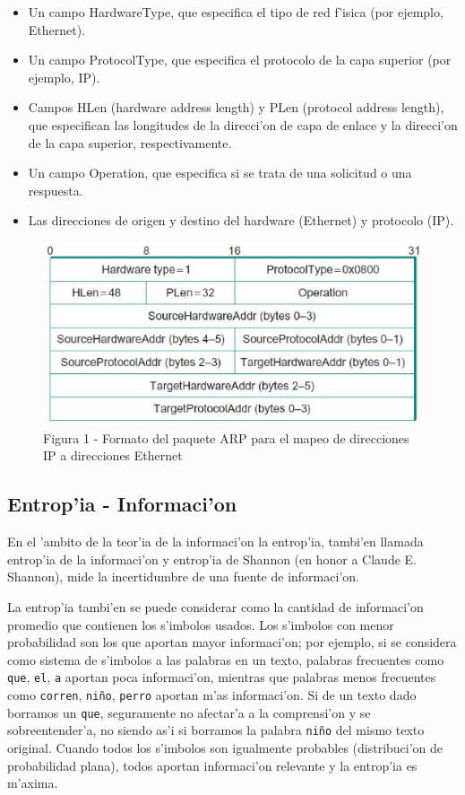 \documentclass[a4paper,10pt]{article}
\begin{document}
\begin{itemize}
	\item Un campo HardwareType, que especifica el tipo de red f'isica (por ejemplo, Ethernet).
	\item Un campo ProtocolType, que especifica el protocolo de la capa superior (por ejemplo, IP).
	\item Campos HLen (hardware address length) y PLen (protocol address length), que especifican las longitudes de la direcci'on de capa de enlace y la direcci'on de la capa superior, respectivamente.
	\item Un campo Operation, que especifica si se trata de una solicitud o una respuesta.
	\item Las direcciones de origen y destino del hardware (Ethernet) y protocolo (IP).
\end{itemize}

\begin{figure}[!hbp]
\begin{center}
\includegraphics[width=12cm]{figura1.eps}
\end{center}
\caption{Figura 1 - Formato del paquete ARP para el mapeo de direcciones IP a direcciones Ethernet} \label{figura1}
\end{figure}

\subsection{Entrop'ia - Informaci'on}

En el 'ambito de la teor'ia de la informaci'on la entrop'ia, tambi'en llamada entrop'ia de la informaci'on y entrop'ia de Shannon (en honor a Claude E. Shannon), mide la incertidumbre de una fuente de informaci'on.

\vspace*{5 mm}
La entrop'ia tambi'en se puede considerar como la cantidad de informaci'on promedio que contienen los s'imbolos usados. Los s'imbolos con menor probabilidad son los que aportan mayor informaci'on; por ejemplo, si se considera como sistema de s'imbolos a las palabras en un texto, palabras frecuentes como \texttt{que}, \texttt{el}, \texttt{a} aportan poca informaci'on, mientras que palabras menos frecuentes como \texttt{corren}, \texttt{ni\~no}, \texttt{perro} aportan m'as informaci'on. Si de un texto dado borramos un \texttt{que}, seguramente no afectar'a a la comprensi'on y se sobreentender'a, no siendo as'i si borramos la palabra \texttt{ni\~no} del mismo texto original. Cuando todos los s'imbolos son igualmente probables (distribuci'on de probabilidad plana), todos aportan informaci'on relevante y la entrop'ia es m'axima.
\end{document}
